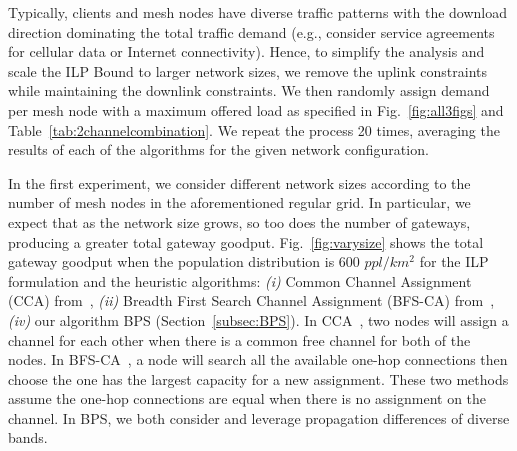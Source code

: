 
Typically, clients and mesh nodes have diverse traffic patterns with
the download direction dominating the total traffic demand (e.g., consider
service agreements for cellular data or Internet connectivity). Hence, to
simplify the analysis and scale the ILP Bound to larger network sizes, we 
remove the uplink constraints while maintaining the downlink constraints.
We then randomly assign demand per mesh node with a maximum offered load
as specified in Fig.~\ref{fig:all3figs} and Table~\ref{tab:2channelcombination}.
We repeat the process 20 times, averaging the results of each of the
algorithms for the given network configuration.

In the first experiment, we consider different network sizes according to
the number of mesh nodes in the aforementioned regular grid. In particular,
we expect that as the network size grows, so too does the number of gateways,
producing a greater total gateway goodput. Fig.~\ref{fig:varysize} shows
the total gateway goodput when the 
population distribution is 600 $ppl/km^2$
for the ILP formulation and the heuristic algorithms: 
{\it (i)} Common Channel Assignment (CCA) from~\cite{draves2004routing},
{\it (ii)} Breadth First Search Channel Assignment (BFS-CA) from~\cite{ramachandran2006interference},
{\it (iv)} our algorithm BPS (Section~\ref{subsec:BPS}).
In CCA~\cite{draves2004routing}, two nodes will assign a channel for each other when there is a common
free channel for both of the nodes. In BFS-CA~\cite{tang2005interference}, a node will search all the 
available one-hop connections then choose the one has the largest capacity for a new assignment. 
These two methods assume the one-hop connections are equal when there is no assignment on the channel. 
In BPS, we both consider and leverage propagation differences of diverse bands.


